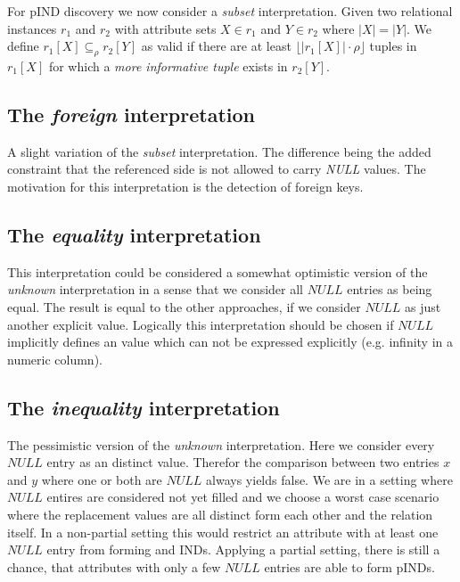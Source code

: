 For pIND discovery we now consider a \textit{subset} interpretation. Given two relational instances $r_1$ and $r_2$ with attribute sets
$X \in r_1$ and $Y \in r_2$ where $|X| = |Y|$. We define $r_1[X] \subseteq_\rho r_2[Y]$ as valid if there are at least $\lfloor |r_1[X]| \cdot \rho \rfloor$
tuples in $r_1[X]$ for which a \textit{more informative tuple} exists in $r_2[Y]$.

\subsection{The \textit{foreign} interpretation}
A slight variation of the \textit{subset} interpretation. The difference being the added constraint that the referenced side is not allowed to
carry \textit{NULL} values. The motivation for this interpretation is the detection of foreign keys.

\subsection{The \textit{equality} interpretation}
This interpretation could be considered a somewhat optimistic version of the \textit{unknown} interpretation in a sense that we consider all $NULL$ entries as being equal.
The result is equal to the other approaches, if we consider $NULL$ as just another explicit value.
Logically this interpretation should be chosen if $NULL$ implicitly defines an value which can not be expressed explicitly (e.g. infinity in a numeric column).

\subsection{The \textit{inequality} interpretation}
The pessimistic version of the \textit{unknown} interpretation. Here we consider every $NULL$ entry as an distinct value.
Therefor the comparison between two entries $x$ and $y$ where one or both are $NULL$ always yields false.
We are in a setting where $NULL$ entires are considered not yet filled and we choose a worst case scenario where the
replacement values are all distinct form each other and the relation itself.
In a non-partial setting this would restrict an attribute with at least one $NULL$ entry from forming and INDs. Applying
a partial setting, there is still a chance, that attributes with only a few $NULL$ entries are able to form pINDs.